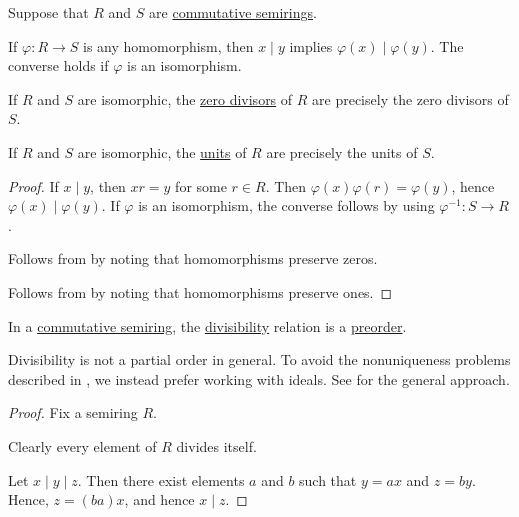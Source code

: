 \begin{proposition}\label{thm:divisibility_and_isomorphisms}
  Suppose that \( R \) and \( S \) are \hyperref[def:semiring/commutative]{commutative semirings}.

  \begin{thmenum}
     If \( \varphi: R \to S \) is any homomorphism, then \( x \mid y \) implies \( \varphi(x) \mid \varphi(y) \). The converse holds if \( \varphi \) is an isomorphism.

     If \( R \) and \( S \) are isomorphic, the \hyperref[def:divisibility/zero]{zero divisors} of \( R \) are precisely the zero divisors of \( S \).

     If \( R \) and \( S \) are isomorphic, the \hyperref[def:divisibility/unit]{units} of \( R \) are precisely the units of \( S \).
  \end{thmenum}
\end{proposition}
\begin{proof}
   If \( x \mid y \), then \( xr = y \) for some \( r \in R \). Then \( \varphi(x) \varphi(r) = \varphi(y) \), hence \( \varphi(x) \mid \varphi(y) \). If \( \varphi \) is an isomorphism, the converse follows by using \( \varphi^{-1}: S \to R \).

   Follows from  by noting that homomorphisms preserve zeros.

   Follows from  by noting that homomorphisms preserve ones.
\end{proof}

\begin{proposition}\label{thm:semiring_divisibility_order}
  In a \hyperref[def:semiring/commutative]{commutative semiring}, the \hyperref[def:divisibility]{divisibility} relation is a \hyperref[def:preordered_set]{preorder}.
\end{proposition}
\begin{comments}
  \item Divisibility is not a partial order in general. To avoid the nonuniqueness problems described in , we instead prefer working with ideals. See  for the general approach.
\end{comments}
\begin{proof}
  Fix a semiring \( R \).

   Clearly every element of \( R \) divides itself.

   Let \( x \mid y \mid z \). Then there exist elements \( a \) and \( b \) such that \( y = a x \) and \( z = b y \). Hence, \( z = (ba) x \), and hence \( x \mid z \).
\end{proof}

